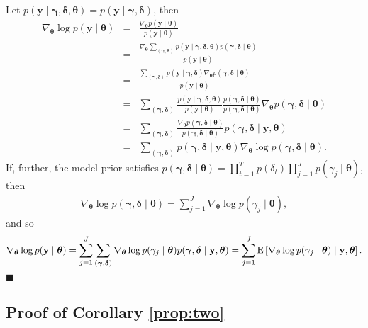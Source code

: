 \documentclass[12pt]{article}
\newcommand{\E}{\mbox{\textup{E}}}
\newcommand{\mb}[1]{\mathbf{#1}}
\newcommand{\by}{{\mb{y}}}
\newcommand{\bgamma}{{\bm{\gamma}}}
\newcommand{\bdelta}{{\bm{\delta}}}
\newcommand{\btheta}{{\bm{\theta}}}
\begin{document}
Let $p(\by \mid \bgamma, \bdelta, \btheta) = p(\by \mid \bgamma, \bdelta)$, then
\begin{eqnarray}
\nabla_{\btheta} \log p(\by \mid \btheta) &=& \frac{\nabla_{\btheta} p(\by \mid \btheta)}{p(\by \mid \btheta)}  \nonumber \\
&=& \frac{\nabla_{\btheta} \sum_{(\bgamma, \bdelta)} p(\by \mid \bgamma, \bdelta, \btheta) p(\bgamma, \bdelta \mid \btheta)}{p(\by \mid \btheta)} \nonumber \\
&=& \frac{\sum_{(\bgamma, \bdelta)} p(\by \mid \bgamma, \bdelta) \nabla_{\btheta}  p(\bgamma, \bdelta \mid \btheta)}{p(\by \mid \btheta)} \nonumber \\
&=& \sum_{(\bgamma, \bdelta)} \frac{p(\by \mid \bgamma, \bdelta, \btheta)}{p(\by \mid \btheta)} \frac{p(\bgamma, \bdelta \mid \btheta)}{p(\bgamma, \bdelta \mid \btheta)} \nabla_{\btheta} p(\bgamma, \bdelta \mid \btheta) \nonumber \\
&=& \sum_{(\bgamma, \bdelta)} \frac{\nabla_{\btheta} p(\bgamma, \bdelta \mid \btheta)}{p(\bgamma, \bdelta \mid \btheta)} p(\bgamma, \bdelta \mid \by, \btheta) \nonumber \\
&=& \sum_{(\bgamma, \bdelta)} p(\bgamma, \bdelta \mid \by, \btheta) \nabla_{\btheta} \log p(\bgamma, \bdelta \mid \btheta).
\end{eqnarray}
If, further, the model prior satisfies $p(\bgamma, \bdelta \mid \btheta) = \prod_{t=1}^{T} p(\delta_{t}) \prod_{j=1}^{J} p(\gamma_{j} \mid \btheta)$, then
\begin{align*}
\nabla_{\btheta} \log p(\bgamma, \bdelta \mid \btheta) = \sum_{j=1}^{J} \nabla_{\btheta} \log p(\gamma_{j} \mid \btheta),
\end{align*}
and so
\begin{align*}
\nabla_{\btheta} \log p(\by \mid \btheta) = \sum_{j=1}^{J} \sum_{(\bgamma, \bdelta)} \nabla_{\btheta} \log p(\gamma_{j} \mid \btheta) p(\bgamma, \bdelta \mid \by, \btheta) = \sum_{j=1}^{J} \E\left[ \nabla_{\btheta} \log p(\gamma_{j} \mid \btheta) \mid \by, \btheta \right].
\end{align*}
\hfill $\blacksquare$

\subsection{Proof of Corollary \ref{prop:two}} \label{sec:proof_prop2}
\end{document}
